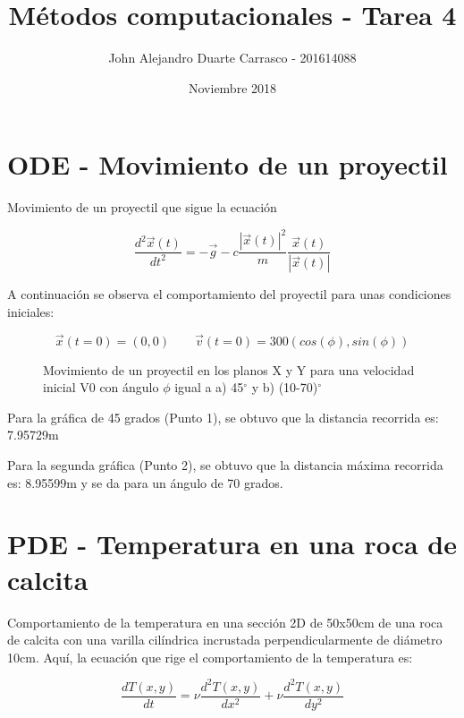 \documentclass{article}
\title{Métodos computacionales - Tarea 4}
\author{John Alejandro Duarte Carrasco - 201614088}
\date{Noviembre 2018}
\begin{document}
\maketitle

\section*{ODE - Movimiento de un proyectil}

Movimiento de un proyectil que sigue la ecuación

\begin{equation}
    \frac{d^{2}\vec{x}(t)}{dt^{2}}=-\vec{g}-c\frac{|\vec{x}(t)|^{2}}{m}\frac{\vec{x}(t)}{|\vec{x}(t)|}
\end{equation}

A continuación se observa el comportamiento del proyectil para unas condiciones iniciales:

\begin{equation}
    \vec{x}(t=0)=(0,0) \qquad \vec{v}(t=0)=300(cos(\phi),sin(\phi))
\end{equation}

\begin{figure}[H]
    \centering
    \caption{Movimiento de un proyectil en los planos X y Y para una velocidad inicial V0 con ángulo $\phi$ igual a a) 45$^{\circ}$ y b) (10-70)$^{\circ}$}
    \label{fig:CondicionesFijasTemp}
\end{figure}

Para la gráfica de 45 grados (Punto 1), se obtuvo que la distancia recorrida es: 7.95729m

Para la segunda gráfica (Punto 2), se obtuvo que la distancia máxima recorrida es: 8.95599m y se da para un ángulo de 70 grados.


\section*{PDE - Temperatura en una roca de calcita}

Comportamiento de la temperatura en una sección 2D de 50x50cm de una roca de calcita con una varilla cilíndrica incrustada perpendicularmente de diámetro 10cm. Aquí, la ecuación que rige el comportamiento de la temperatura es:

\begin{equation}
    \frac{dT(x,y)}{dt}=\nu\frac{d^{2}T(x,y)}{dx^{2}}+\nu\frac{d^{2}T(x,y)}{dy^{2}}
\end{equation}
\end{document}
